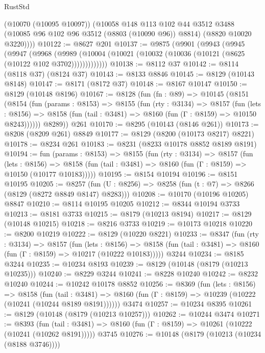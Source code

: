 \begin{lexlean}{RustStd}
\begin{coremodule}
        (@10070 (@10095 @10097))
        (@10058
          @148
          @113
          @102
          @44
          @3512
          @3488
          (@10085 @96 @102 @96 @3512 (@8803 (@10090 @96)) @8814)
          (@8820 @10020 @3220))))
@10122 := @8627 @201
@10137 := @9875
    (@9901
      (@9943
        (@9945
          (@9947
            (@9968
              (@9989 (@10004 (@10021 (@10032 (@10036 (@10121 (@8625 (@10122 @102 @3702)))))))))))))
@10138 := @8112 @37
@10142 := @8114 (@8118 @37) (@8124 @37)
@10143 := @8133 @8846
@10145 := @8129 (@10143 @8148)
@10147 := @8171 (@8172 @37)
@10148 := @8167 @10147
@10150 := @8129 (@10148 @8196)
@10167 := @8128
    (fun (fn : @89) =>
    @10145
      (@8151
        (@8154
          (fun (params : @8153) =>
          @8155
            (fun (rty : @3134) =>
            @8157
              (fun (lets : @8156) =>
              @8158 (fun (tail : @3481) => @8160 (fun (Γ : @8159) => @10150 @8243))))))
        @8289))
    @261
@10170 := @8295 (@10143 (@8146 @261))
@10173 := @8208 (@8209 @261) @8849
@10177 := @8129 (@8200 (@10173 @8217) @8221)
@10178 := @8234 @261
@10183 := @8231 (@8233 @10178 @8852 @8189 @8191)
@10194 := fun (params : @8153) =>
  @8155
    (fun (rty : @3134) =>
    @8157
      (fun (lets : @8156) =>
      @8158 (fun (tail : @3481) => @8160 (fun (Γ : @8159) => @10150 (@10177 @10183)))))
@10195 := @8154 @10194
@10196 := @8151 @10195
@10205 := @8257 (fun (U : @8256) => @8258 (fun (t : @7) => @8266 (@8129 (@8272 @8849 @8147) @8283)))
@10208 := @10170 (@10196 @10205) @8847
@10210 := @8114 @10195 @10205
@10212 := @8344 @10194 @3733
@10213 := @8181 @3733
@10215 := @8179 (@10213 @8194)
@10217 := @8129 (@10148 @10215)
@10218 := @8216 @3733
@10219 := @10173 @10218
@10220 := @8200 @10219
@10222 := @8129 (@10220 @8221)
@10233 := @8347
    (fun (rty : @3134) =>
    @8157
      (fun (lets : @8156) =>
      @8158 (fun (tail : @3481) => @8160 (fun (Γ : @8159) => @10217 (@10222 @10183)))))
    @3244
@10234 := @8185 @3244
@10235 := @10234 @8193
@10239 := @8129 (@10148 (@8179 (@10213 @10235)))
@10240 := @8229 @3244
@10241 := @8228 @10240
@10242 := @8232 @10240
@10244 := @10242 @10178 @8852
@10256 := @8369
    (fun (lets : @8156) =>
    @8158
      (fun (tail : @3481) =>
      @8160 (fun (Γ : @8159) => @10239 (@10222 (@10241 (@10244 @8189 @8191))))))
    @3474
@10257 := @10234 @8395
@10261 := @8129 (@10148 (@8179 (@10213 @10257)))
@10262 := @10244 @3474
@10271 := @8393
    (fun (tail : @3481) => @8160 (fun (Γ : @8159) => @10261 (@10222 (@10241 (@10262 @8191)))))
    @3745
@10276 := @10148 (@8179 (@10213 (@10234 (@8188 @3746))))

\end{coremodule}
\end{lexlean}
